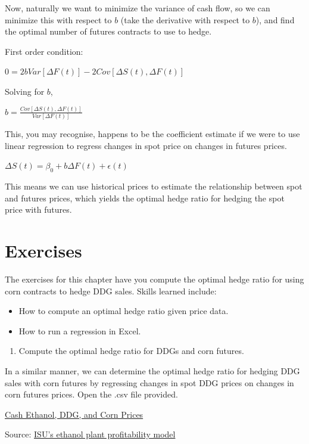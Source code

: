 \documentclass[
  letterpaper,
  DIV=11,
  numbers=noendperiod]{scrreprt}
\providecommand{\tightlist}{%
  \setlength{\itemsep}{0pt}\setlength{\parskip}{0pt}}\usepackage{longtable,booktabs,array}
\begin{document}
Now, naturally we want to minimize the variance of cash flow, so we can
minimize this with respect to \(b\) (take the derivative with respect to
\(b\)), and find the optimal number of futures contracts to use to
hedge.

First order condition:

\(0 = 2bVar[\Delta F(t)] - 2Cov[\Delta S(t),\Delta F(t)]\)

Solving for \(b\),

\(b = \frac{Cov[\Delta S(t),\Delta F(t)]}{Var[\Delta F(t)]}\)

This, you may recognise, happens to be the coefficient estimate if we
were to use linear regression to regress changes in spot price on
changes in futures prices.

\(\Delta S(t) = \beta_0 + b\Delta F(t) + \epsilon(t)\)

This means we can use historical prices to estimate the relationship
between spot and futures prices, which yields the optimal hedge ratio
for hedging the spot price with futures.

\section{Exercises}\label{exercises-6}

The exercises for this chapter have you compute the optimal hedge ratio
for using corn contracts to hedge DDG sales. Skills learned include:

\begin{itemize}
\item
  How to compute an optimal hedge ratio given price data.
\item
  How to run a regression in Excel.
\end{itemize}

\begin{enumerate}
\def\labelenumi{\arabic{enumi}.}
\tightlist
\item
  Compute the optimal hedge ratio for DDGs and corn futures.
\end{enumerate}

In a similar manner, we can determine the optimal hedge ratio for
hedging DDG sales with corn futures by regressing changes in spot DDG
prices on changes in corn futures prices. Open the .csv file provided.

\href{http://mindymallory.github.io/PriceAnalysis/Excel-files/Ethanol-Prices.csv}{Cash
Ethanol, DDG, and Corn Prices}

Source:
\href{https://www.extension.iastate.edu/agdm/articles/hof/HofJan08.html}{ISU's
ethanol plant profitability model}
\end{document}

